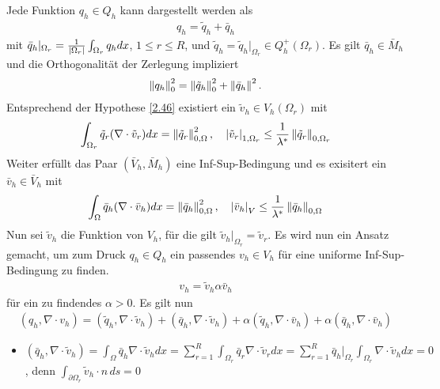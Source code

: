 \begin{beweis}
  Jede Funktion $q_{h} \in Q_{h}$ kann dargestellt werden als 
  \begin{align*}
    q_{h} = \tilde q_{h} + \bar q_{h}
  \end{align*}
mit $\bar q_{h}|_{\Omega_{r}} = \frac 1 {\left|\Omega_{r}\right|} \int_{\Omega_{r}} q_{h} dx$, $1 \leq r\leq R$, und $\tilde q_{h} = \tilde q_{h}|_{\Omega_{r}} \in Q_{h}^{+}(\Omega_{r})$. Es gilt $\bar q_{h} \in \bar M_{h}$ und die Orthogonalität der Zerlegung impliziert
\begin{align*}
  \left \|q_{h} \right\|_{0}^{2} = \left \|\tilde q_{h} \right\|_{0}^{2} + \left \|\bar q_{h} \right\|^{2}. 
\end{align*}
Entsprechend der Hypothese \ref{2.46} existiert ein $\tilde v_{h}\in V_{h} (\Omega_{r})$ mit
\begin{align*}
  \int_{\Omega_{r}} \tilde q_{r} (\nabla\cdot \tilde v_{r}) dx = \left \|\tilde q_{r} \right\|_{0, \Omega}^{2}, \quad \left|\tilde v_{r}\right|_{1, \Omega_{r}} \leq \frac 1 {\lambda^{*}}\left \|\tilde q_{r} \right\|_{0, \Omega_{r}}
\end{align*}
Weiter erfüllt das Paar $(\bar V_h, \bar M_{h})$ eine Inf-Sup-Bedingung und es exisitert ein $\bar v_{h} \in \bar V_{h}$ mit
\begin{align*}
    \int_{\Omega} \bar q_{h} (\nabla\cdot \bar v_{h}) dx = \left \|\bar q_{h} \right\|_{0, \Omega}^{2}, \quad \left|\bar v_{h}\right|_{V} \leq \frac 1 {\lambda^{*}}\left \|\bar q_{h} \right\|_{0, \Omega}
\end{align*} 
Nun sei $\tilde v_{h}$ die Funktion von $V_{h}$, für die gilt $\tilde v_{h}|_{\Omega_{r}} = \tilde v_{r}$. Es wird nun ein Ansatz gemacht, um zum Druck $q_{h} \in Q_{h}$ ein passendes $v_{h} \in V_{h}$ für eine uniforme Inf-Sup-Bedingung zu finden.
\begin{align*}
  v_{h}= \tilde v_{h} \alpha \bar v_{h}
\end{align*}
für ein zu findendes $\alpha  > 0$. Es gilt nun
\begin{align*}
  (q_{h}, \nabla\cdot v_{h}) = (\tilde q_{h}, \nabla\cdot \tilde v_{h}) + (\bar q_{h}, \nabla\cdot \tilde v_{h}) +  \alpha(\tilde q_{h}, \nabla\cdot \bar v_{h}) +  \alpha(\bar q_{h}, \nabla\cdot \bar v_{h}) 
\end{align*}
\begin{itemize}
\item   $(\bar q_{h}, \nabla\cdot \tilde v_{h})  = \int_{\Omega} \bar q_{h}\nabla\cdot \tilde v_{h}dx = \sum_{r = 1}^{R} \int_{\Omega_{r}} \bar q_{r} \nabla\cdot \tilde v_{r} dx = \sum_{r = 1}^{R} \bar q_{h}|_{\Omega_{r}} \int_{\Omega_{r}} \nabla\cdot \tilde v_{h} dx = 0$, denn $\int_{\partial \Omega_{r}} \tilde v_{h}\cdot n \,ds = 0$

\end{itemize}
\end{beweis}
